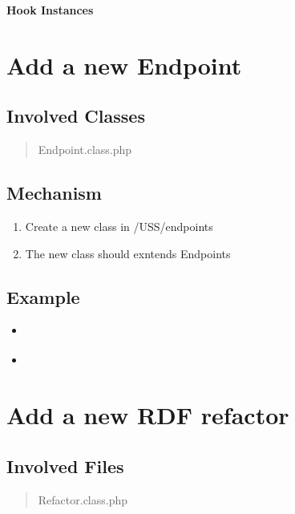 \documentclass[letterpaper,10pt,english]{sphinxmanual}
\begin{document}
\textbf{Hook Instances}


\section{Add a new Endpoint}
\label{docs/hooks/new_endpoint::doc}\label{docs/hooks/new_endpoint:add-a-new-endpoint}\label{docs/hooks/new_endpoint:hook-new-endpoint}

\subsection{Involved Classes}
\label{docs/hooks/new_endpoint:involved-classes}\begin{quote}

Endpoint.class.php
\end{quote}


\subsection{Mechanism}
\label{docs/hooks/new_endpoint:mechanism}\begin{enumerate}
\item {} 
Create a new class in /USS/endpoints

\item {} 
The new class should exntends Endpoints

\end{enumerate}


\subsection{Example}
\label{docs/hooks/new_endpoint:example}\begin{itemize}
\item {} 
{\hyperref[docs/api:Dbpedia]{}}

\item {} 
{\hyperref[docs/api:LinkedGeoData]{}}

\end{itemize}


\section{Add a new RDF refactor}
\label{docs/hooks/new_refactor:hook-refactor}\label{docs/hooks/new_refactor:add-a-new-rdf-refactor}\label{docs/hooks/new_refactor::doc}

\subsection{Involved Files}
\label{docs/hooks/new_refactor:involved-files}\begin{quote}

Refactor.class.php
\end{quote}
\end{document}
